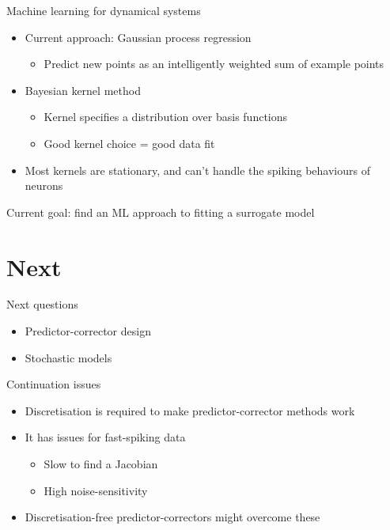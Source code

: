 \documentclass[presentation]{beamer}
\begin{document}
\begin{frame}[label={sec:orgabca2d7}]{Machine learning for dynamical systems}
\begin{itemize}
\item Current approach: Gaussian process regression
\begin{itemize}
\item Predict new points as an intelligently weighted sum of example points
\end{itemize}
\item Bayesian kernel method
\begin{itemize}
\item Kernel specifies a distribution over basis functions
\item Good kernel choice = good data fit
\end{itemize}
\item Most kernels are stationary, and can't handle the spiking behaviours of neurons
\end{itemize}

\vfill

Current goal: find an ML approach to fitting a surrogate model
\end{frame}


\section{Next}
\label{sec:orgd022894}

\begin{frame}[label={sec:orgd519b16}]{Next questions}
\begin{itemize}
\item Predictor-corrector design
\item Stochastic models
\end{itemize}
\end{frame}

\begin{frame}[label={sec:org4e4a4ab}]{Continuation issues}
\begin{itemize}
\item Discretisation is required to make predictor-corrector methods work
\item It has issues for fast-spiking data
\begin{itemize}
\item Slow to find a Jacobian
\item High noise-sensitivity
\end{itemize}
\item Discretisation-free predictor-correctors might overcome these
\end{itemize}
\end{frame}
\end{document}
